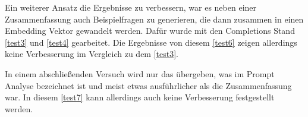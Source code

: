 \documentclass[../main.tex]{subfiles}
\begin{document}
Ein weiterer Ansatz die Ergebnisse zu verbessern, war es neben einer Zusammenfassung auch Beispielfragen zu generieren, die dann zusammen in einen Embedding Vektor gewandelt werden.
Dafür wurde mit den Completions Stand \ref{test3} und \ref{test4} gearbeitet.
Die Ergebnisse von diesem \ref{test6} zeigen allerdings keine Verbesserung im Vergleich zu dem \ref{test3}.

In einem abschließenden Versuch wird nur das übergeben, was im Prompt Analyse bezeichnet ist und meist etwas ausführlicher als die Zusammenfassung war. 
In diesem \ref{test7} kann allerdings auch keine Verbesserung festgestellt werden.
\end{document}
